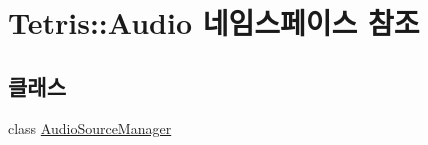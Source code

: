 \hypertarget{namespace_tetris_1_1_audio}{}\section{Tetris\+:\+:Audio 네임스페이스 참조}
\label{namespace_tetris_1_1_audio}
\subsection*{클래스}
\begin{DoxyCompactItemize}
\item 
class \hyperlink{class_tetris_1_1_audio_1_1_audio_source_manager}{Audio\+Source\+Manager}
\end{DoxyCompactItemize}

